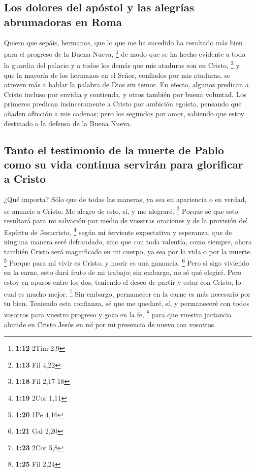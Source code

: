 \hypertarget{los-dolores-del-apuxf3stol-y-las-alegruxedas-abrumadoras-en-roma}{%
\subsection{Los dolores del apóstol y las alegrías abrumadoras en
Roma}\label{los-dolores-del-apuxf3stol-y-las-alegruxedas-abrumadoras-en-roma}}

 Quiero que sepáis, hermanos, que lo que me ha sucedido
ha resultado más bien para el progreso de la Buena Nueva, \footnote{\textbf{1:12}
  2Tim 2,9}  de modo que se ha hecho evidente a toda la
guardia del palacio y a todos los demás que mis ataduras son en Cristo,
\footnote{\textbf{1:13} Fil 4,22}  y que la mayoría de
los hermanos en el Señor, confiados por mis ataduras, se atreven más a
hablar la palabra de Dios sin temor.  En efecto, algunos
predican a Cristo incluso por envidia y contienda, y otros también por
buena voluntad.  Los primeros predican insinceramente a
Cristo por ambición egoísta, pensando que añaden aflicción a mis
cadenas;  pero los segundos por amor, sabiendo que estoy
destinado a la defensa de la Buena Nueva.

\hypertarget{tanto-el-testimonio-de-la-muerte-de-pablo-como-su-vida-continua-serviruxe1n-para-glorificar-a-cristo}{%
\subsection{Tanto el testimonio de la muerte de Pablo como su vida
continua servirán para glorificar a
Cristo}\label{tanto-el-testimonio-de-la-muerte-de-pablo-como-su-vida-continua-serviruxe1n-para-glorificar-a-cristo}}

 ¿Qué importa? Sólo que de todas las maneras, ya sea en
apariencia o en verdad, se anuncie a Cristo. Me alegro de esto, sí, y me
alegraré. \footnote{\textbf{1:18} Fil 2,17-18}  Porque sé
que esto resultará para mi salvación por medio de vuestras oraciones y
de la provisión del Espíritu de Jesucristo, \footnote{\textbf{1:19} 2Cor
  1,11}  según mi ferviente expectativa y esperanza, que
de ninguna manera seré defraudado, sino que con toda valentía, como
siempre, ahora también Cristo será magnificado en mi cuerpo, ya sea por
la vida o por la muerte. \footnote{\textbf{1:20} 1Pe 4,16}
 Porque para mí vivir es Cristo, y morir es una ganancia.
\footnote{\textbf{1:21} Gal 2,20}  Pero si sigo viviendo
en la carne, esto dará fruto de mi trabajo; sin embargo, no sé qué
elegiré.  Pero estoy en apuros entre los dos, teniendo el
deseo de partir y estar con Cristo, lo cual es mucho mejor. \footnote{\textbf{1:23}
  2Cor 5,8}  Sin embargo, permanecer en la carne es más
necesario por tu bien.  Teniendo esta confianza, sé que
me quedaré, sí, y permaneceré con todos vosotros para vuestro progreso y
gozo en la fe, \footnote{\textbf{1:25} Fil 2,24}  para
que vuestra jactancia abunde en Cristo Jesús en mí por mi presencia de
nuevo con vosotros.

